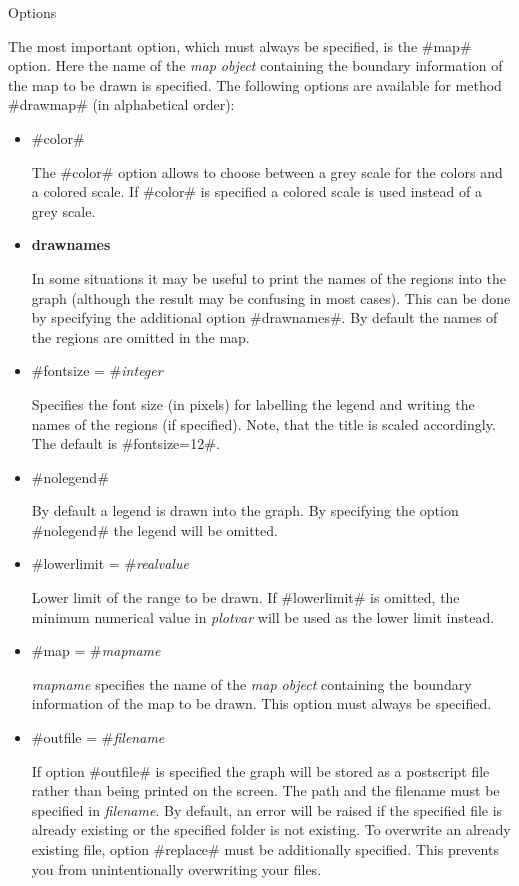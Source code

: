 \begin{stanza}{Options}

{The most important option, which must always be specified,  is the
#map# option. Here the name of the {\em map object} containing the
boundary information of the map to be drawn is specified. The
following options are available for method #drawmap# (in
alphabetical order):}
\end{stanza}

\begin{itemize}
\item #color#

The #color# option allows to choose between a grey scale for the
colors and a colored scale. If #color# is specified a colored
scale is used instead of a grey scale. \item {\bf drawnames}

In some situations it may be useful to print the names of the
regions into the graph (although the result may be confusing in
most cases). This can be done by specifying the additional option
#drawnames#. By default the names of the regions are omitted in
the map.

\item #fontsize = #{\em integer}

Specifies the font size (in pixels) for labelling the legend and
writing the names of the regions (if specified). Note, that the
title is scaled accordingly. The default is #fontsize=12#.

\item #nolegend#

By default a legend is drawn into the graph. By specifying the
option #nolegend# the legend will be omitted.

\item #lowerlimit = #{\em realvalue}

Lower limit of the range to be drawn. If #lowerlimit# is omitted,
the minimum numerical value in {\em plotvar} will be used as the
lower limit instead.

\item #map = #{\em mapname}

{\em mapname} specifies the name of the {\em map object}
containing the boundary information of the map to be drawn. This
option must always be specified.

\item #outfile = #{\em filename}

If option #outfile# is specified the graph will be stored as a
postscript file rather than being printed on the screen. The path
and the filename must be specified in {\em filename}. By
default, an error will be raised if the specified file  is already
existing or the specified folder is not existing. To overwrite  an
already existing file, option #replace# must be additionally
specified. This prevents you from unintentionally overwriting your
files.


\end{itemize}
